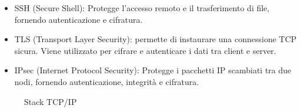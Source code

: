 \begin{itemize}
    \item SSH (Secure Shell): Protegge l'accesso remoto e il trasferimento
    di file, fornendo autenticazione e cifratura.
    \item TLS (Transport Layer Security): permette di instaurare una
    connessione TCP sicura. Viene utilizzato per cifrare e autenticare i dati tra
    client e server.
    \item IPsec (Internet Protocol Security): Protegge i pacchetti IP
    scambiati tra due nodi, fornendo autenticazione, integrità e cifratura.
\end{itemize}

\begin{figure}[h!]
    \centering 
    \caption{Stack TCP/IP} 
    \label{fig:tcp stack} 
    
\end{figure}

